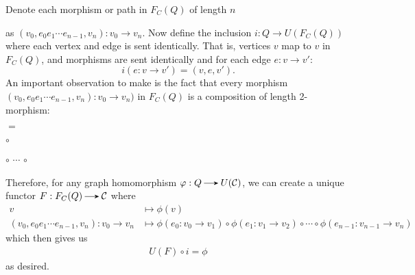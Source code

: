     \begin{prf}
        Denote each morphism or path in $F_C(Q)$ of length $n$
        \begin{center}
        \end{center}
        as $(v_0, e_0e_1\cdots e_{n-1}, v_n): v_0 \to v_n$. Now define the inclusion 
        $i: Q \to U(F_C(Q))$ where each vertex and edge is sent identically. That is, vertices 
        $v$ map to $v$ in $F_C(Q)$,  and morphisms are sent identically and for each 
        edge $e: v \to v'$:
        \[
            i(e: v \to v') = (v, e, v').
        \]
        An important observation to make is the fact that every morphism $(v_0, e_0e_1\cdots e_{n-1}, v_n): v_0 \to v_n)$
        in $F_C(Q)$ is a composition of length 2-morphism: 
        \begin{center}
        \end{center}
        \begin{center}
            $=$
            $\circ$
            $\circ$
            $\cdots$
            $\circ$
        \end{center}
        Therefore, for any graph homomorphism $\phi: Q \to U(\cc)$, 
        we can create a unique functor $F: F_C(Q) \to \cc$ where 
        \begin{align*}
            v &\longmapsto \phi(v)\\
            (v_0, e_0e_1\cdots e_{n-1}, v_n): v_0 \to v_n &\longmapsto 
            \phi(e_0:  v_0 \to v_1) \circ \phi(e_1: v_1 \to v_2)
            \circ \cdots \circ \phi(e_{n-1}: v_{n-1} \to v_n)
        \end{align*}
        which then gives us 
        \begin{align*}
            U(F) \circ i = \phi
        \end{align*}
        as desired. 
    \end{prf}
    

